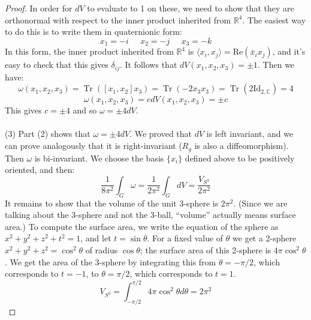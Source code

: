 \documentclass[12 pt]{article}
\newcommand{\R}{\mathbb{R}}
\newcommand{\C}{\mathbb{C}}
\DeclareMathOperator{\Tr}{Tr}
\begin{document}
\begin{proof}
In order for $dV$ to evaluate to 1 on these, we need to show that they are orthonormal with respect to the inner product inherited from $\R^4$. The easiest way to do this is to write them in quaternionic form:
\[      x_1 = -i \;\;\;\;\;  x_2 = -j \;\;\;\;\; x_3 = -k  \]
In this form, the inner product inherited from $\R^4$ is $\langle x_i , x_j \rangle = \text{Re}(\bar x_i x_j )$, and it's easy to check that this gives $\delta_{ij}$. It follows that $dV(x_1, x_2, x_3) = \pm 1$. Then we have:
\[      \omega(x_1, x_2, x_3) =   \Tr([x_1, x_2] x_3 ) =  \Tr( -2x_3 x_3) = \Tr(2 \text{Id}_{2,\C}) = 4   \]
\[      \omega(x_1, x_2, x_3) = c dV (x_1, x_2, x_3) = \pm c       \]
This gives $c = \pm 4$ and so $\omega = \pm 4 dV$.
\\
\\
(3) Part (2) shows that $\omega = \pm 4 dV$. We proved that $dV$ is left invariant, and we can prove analogously that it is right-invariant ($R_g$ is also a diffeomorphism). Then $\omega$ is bi-invariant. We choose the basis $\{x_i\}$ defined above to be positively oriented, and then:
\[     \frac{1}{8\pi^2} \int_G  \omega =  \frac{1}{2\pi^2} \int_G dV  =  \frac{V_{S^3}}{2\pi^2}  \]
It remains to show that the volume of the unit 3-sphere is $2\pi^2$. (Since we are talking about the 3-sphere and not the 3-ball, ``volume'' actually means surface area.) To compute the surface area, we write the equation of the sphere as $x^2 + y^2 + z^2 + t^2 = 1$, and let $t = \sin \theta$. For a fixed value of $\theta$ we get a 2-sphere $x^2 + y^2 + z^2 = \cos^2 \theta$ of radius $\cos \theta$; the surface area of this 2-sphere is $4\pi \cos^2 \theta$. We get the area of the 3-sphere by integrating this from $\theta = -\pi/2$, which corresponds to $t = -1$, to $\theta = \pi/2$, which corresponds to $t=1$.
\[      V_{S^3} = \int_{-\pi/2}^{\pi/2} 4\pi \cos^2 \theta d \theta = 2\pi^2       \]
\end{proof}
\end{document}
